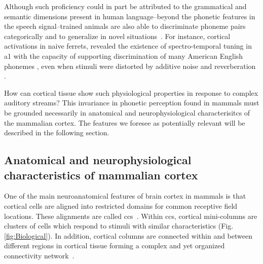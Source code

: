 \documentclass[10pt,letterpaper]{article}
\begin{document}
Although such proficiency could in part be attributed to the grammatical and semantic dimensions present in human language--beyond the phonetic features in the speech signal--trained animals are also able to discriminate phoneme pairs categorically and to generalize in novel situations~\cite{kuhl_1975, kuhl_1983, kluender_1998, pons_2006, hienz_1996, dent_1997, lotto_1997}. For instance, cortical activations in naive ferrets, revealed the existence of spectro-temporal tuning in \gls{a1} with the capacity of supporting discrimination of many American English phonemes \cite{mesgarani_2008}, even when stimuli were distorted by additive noise and reverberation \cite{mesgarani_2014A}.

How can cortical tissue show such physiological properties in response to complex auditory streams? This invariance in phonetic perception found in mammals must be grounded necessarily in anatomical and neurophysiological characterisitcs of the mammalian cortex. The features we foresee as potentially relevant will be described in the following section.







\subsection*{Anatomical and neurophysiological characteristics of mammalian cortex}

One of the main neuroanatomical features of brain cortex in mammals is that cortical cells are aligned into restricted domains for common receptive field locations. These alignments are called \glspl{cc}~\cite{mountcastle_1955, mountcastle_1957, hubel_1962, hubel_1968}. Within \glspl{cc}, cortical mini-columns are clusters of cells which respond to stimuli with similar characteristics (Fig. \ref{fig:Biological}). In addition, cortical columns are connected within and between different regions in cortical tissue forming a complex and yet organized connectivity network~\cite{mountcastle_1997}. 
\end{document}
